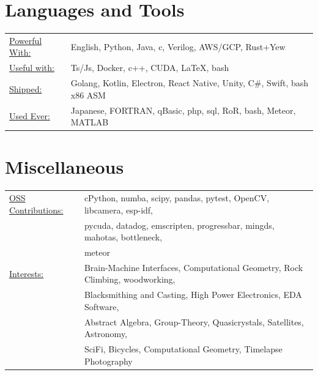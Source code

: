 \documentclass{res}
\let\oldsection\section
\renewcommand{\section}[1]{\needspace{4\baselineskip}\oldsection{#1}}
\begin{document}
\begin{resume}
\section{Languages and Tools}
 \begin{tabular}{l p{5.5in}}
   \underline{Powerful With:} & English, Python, Java, c, Verilog, AWS/GCP,  Rust+Yew \\
   \underline{Useful with:}   & Ts/Js, Docker, c++, CUDA, \LaTeX, bash \\
   \underline{Shipped:}       & Golang, Kotlin, Electron, React Native, Unity, C\#, Swift, bash x86 ASM \\
   \underline{Used Ever:}     & Japanese, FORTRAN, qBasic, php, sql, RoR, bash, Meteor, MATLAB \\
 \end{tabular}

\section{Miscellaneous}
  \begin{tabular}{l p{5.5in}}
    \underline{OSS Contributions:} & cPython, numba, scipy, pandas, pytest, OpenCV, libcamera, esp-idf, \\
                                   & pycuda, datadog, emscripten, progressbar, mingds, mahotas, bottleneck, \\
                                   & meteor  \\
    \underline{Interests:}         & Brain-Machine Interfaces, Computational Geometry, Rock Climbing, woodworking,\\
                                   & Blacksmithing and Casting, High Power Electronics, EDA Software, \\
                                   & Abstract Algebra, Group-Theory, Quasicrystals, Satellites, Astronomy, \\
                                   & SciFi, Bicycles, Computational Geometry, Timelapse Photography
 \end{tabular}

\end{resume}
\end{document}
